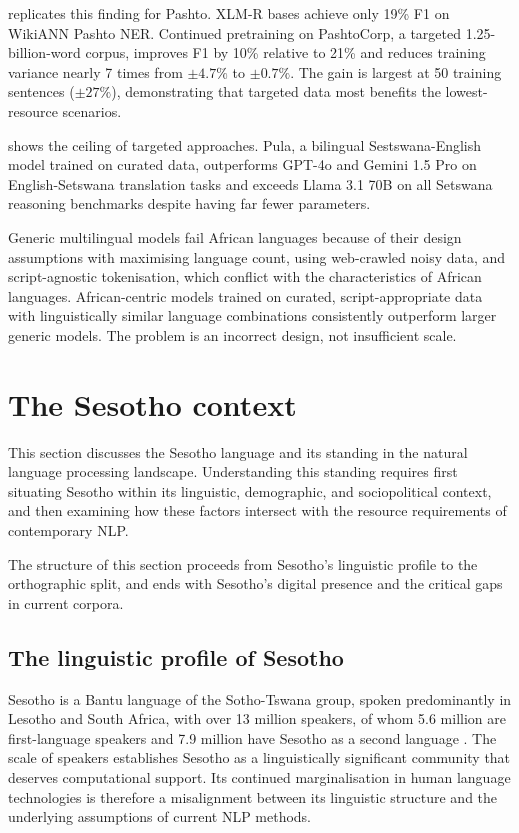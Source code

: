 \documentclass[11pt,a4paper]{article}
\begin{document}
\citet{rahman2026pashtocorp} replicates this finding for Pashto. XLM-R bases achieve only 19\% F1 on WikiANN Pashto NER. Continued pretraining on PashtoCorp, a targeted 1.25-billion-word corpus, improves F1 by 10\% relative to 21\% and reduces training variance nearly 7 times from $\pm 4.7\%$ to $\pm 0.7\%$. The gain is largest at 50 training sentences ($\pm 27\%$), demonstrating that targeted data most benefits the lowest-resource scenarios.

\citet{brown2025pula} shows the ceiling of targeted approaches. Pula, a bilingual Sestswana-English model trained on curated data, outperforms GPT-4o and Gemini 1.5 Pro on English-Setswana translation tasks and exceeds Llama 3.1 70B on all Setswana reasoning benchmarks despite having far fewer parameters.

Generic multilingual models fail African languages because of their design assumptions with maximising language count, using web-crawled noisy data, and script-agnostic tokenisation, which conflict with the characteristics of African languages. African-centric models trained on curated, script-appropriate data with linguistically similar language combinations consistently outperform larger generic models. The problem is an incorrect design, not insufficient scale.


\section{The Sesotho context}
This section discusses the Sesotho language and its standing in the natural language processing landscape. Understanding this standing requires first situating Sesotho within its linguistic, demographic, and sociopolitical context, and then examining how these factors intersect with the resource requirements of contemporary NLP.

The structure of this section proceeds from Sesotho's linguistic profile to the orthographic split, and ends with Sesotho's digital presence and the critical gaps in current corpora.

\subsection{The linguistic profile of Sesotho}
Sesotho is a Bantu language of the Sotho-Tswana group, spoken predominantly in Lesotho and South Africa, with over 13 million speakers, of whom 5.6 million are first-language speakers and 7.9 million have Sesotho as a second language \citep{mokoaleli2020sesotho}. The scale of speakers establishes Sesotho as a linguistically significant community that deserves computational support. Its continued marginalisation in human language technologies is therefore a misalignment between its linguistic structure and the underlying assumptions of current NLP methods.
\end{document}
